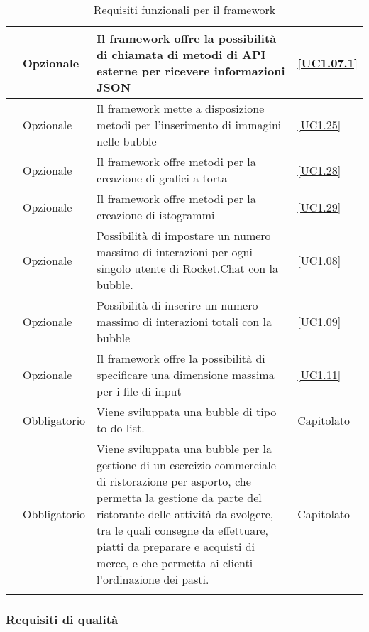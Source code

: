 \begin{longtable}{|P{1.5cm}|P{2.5cm}|P{6.5cm}|P{2.5cm}|}
	\hline \RequisitoOpF\label{L44} & Opzionale & Il framework offre la possibilità di chiamata di metodi di API esterne per ricevere informazioni JSON & \ref{UC1.07.1} \\
	\hline \RequisitoOpF\label{L45} & Opzionale & Il framework mette a disposizione metodi per l'inserimento di immagini nelle bubble & \ref{UC1.25} \\
	\hline \RequisitoOpF\label{L46} & Opzionale & Il framework offre metodi per la creazione di grafici a torta  & \ref{UC1.28} \\
	\hline \RequisitoOpF\label{L64} & Opzionale & Il framework offre metodi per la creazione di istogrammi &\ref{UC1.29} \\	 
	 \hline \RequisitoOpF\label{L47} & Opzionale & Possibilità di impostare un numero massimo di interazioni per ogni singolo utente di Rocket.Chat con la bubble. & \ref{UC1.08} \\
	 \hline \RequisitoOpF\label{L48} & Opzionale & Possibilità di inserire un numero massimo di interazioni totali con la bubble & \ref{UC1.09} \\
	 \hline \RequisitoOpF\label{L49} & Opzionale & Il framework offre la possibilità di specificare una dimensione massima per i file di input & \ref{UC1.11} \\
	 \hline \RequisitoOpF\label{L3} & Obbligatorio & Viene sviluppata una bubble di tipo to-do list. & Capitolato \\
	 \hline \RequisitoOpF\label{L4} & Obbligatorio & Viene sviluppata una bubble per la gestione di un esercizio commerciale di ristorazione per asporto, che permetta la gestione da parte del ristorante delle attività da svolgere, tra le quali consegne da effettuare, piatti da preparare e acquisti di merce, e che permetta ai clienti l'ordinazione dei pasti. & Capitolato \\
	\hline
	\caption{Requisiti funzionali per il framework}
\end{longtable}

\subsubsection{Requisiti di qualità}

